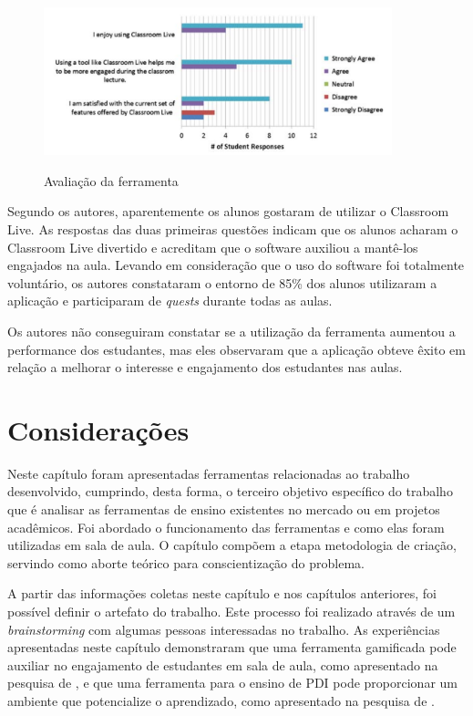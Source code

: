 \documentclass[
	12pt,				%
	oneside,			%
	a4paper,			%
	english,			%
	french,				%
	spanish,			%
	brazil,				%
	]{abntex2}
\begin{document}
\begin{figure}[ht]
\centering
\caption{Avaliação da ferramenta}
\includegraphics[width=0.9\textwidth]{imagens/classroom_avaliacao.png}
\label{fig:classroom_avaliacao}
\end{figure}

Segundo os autores, aparentemente os alunos gostaram de utilizar o Classroom Live. As respostas das duas primeiras questões indicam que os alunos acharam o Classroom Live divertido e acreditam que o software auxiliou a mantê-los engajados na aula. Levando em consideração que o uso do software foi totalmente voluntário, os autores constataram o entorno de 85\% dos alunos utilizaram a aplicação e participaram de \textit{quests} durante todas as aulas. 

Os autores não conseguiram constatar se a utilização da ferramenta aumentou a performance dos estudantes, mas eles observaram que a aplicação obteve êxito em relação a melhorar o interesse e engajamento dos estudantes nas aulas.

\section{Considerações}

Neste capítulo foram apresentadas ferramentas relacionadas ao trabalho desenvolvido, cumprindo, desta forma, o terceiro objetivo específico do trabalho que é analisar as ferramentas de ensino existentes no mercado ou em projetos acadêmicos. Foi abordado o funcionamento das ferramentas e como elas foram utilizadas em sala de aula. O capítulo compõem a etapa metodologia de criação, servindo como aborte teórico para conscientização do problema. 

A partir das informações coletas neste capítulo e nos capítulos anteriores, foi possível definir o artefato do trabalho. Este processo foi realizado através de um \textit{brainstorming} com algumas pessoas interessadas no trabalho. As experiências apresentadas neste capítulo demonstraram que uma ferramenta gamificada pode auxiliar no engajamento de estudantes em sala de aula, como apresentado na pesquisa de \citet{de2013classroom}, e que uma ferramenta para o ensino de PDI pode proporcionar um ambiente que potencialize o aprendizado, como apresentado na pesquisa de \citet{cazorla2015javavis}.
\end{document}
